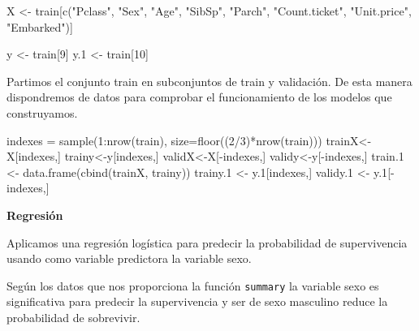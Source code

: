 \documentclass[
]{article}
\newenvironment{Shaded}{\begin{snugshade}}{\end{snugshade}}
\newcommand{\DataTypeTok}[1]{\textcolor[rgb]{0.87,0.87,0.75}{#1}}
\newcommand{\DecValTok}[1]{\textcolor[rgb]{0.86,0.86,0.80}{#1}}
\newcommand{\FloatTok}[1]{\textcolor[rgb]{0.75,0.75,0.82}{#1}}
\newcommand{\KeywordTok}[1]{\textcolor[rgb]{0.94,0.87,0.69}{#1}}
\newcommand{\NormalTok}[1]{\textcolor[rgb]{0.80,0.80,0.80}{#1}}
\newcommand{\OperatorTok}[1]{\textcolor[rgb]{0.94,0.94,0.82}{#1}}
\newcommand{\StringTok}[1]{\textcolor[rgb]{0.80,0.58,0.58}{#1}}
\begin{document}
\begin{Shaded}
\begin{Highlighting}[]
\NormalTok{X <-}\StringTok{ }\NormalTok{train[}\KeywordTok{c}\NormalTok{(}\StringTok{"Pclass"}\NormalTok{, }\StringTok{"Sex"}\NormalTok{, }\StringTok{"Age"}\NormalTok{, }\StringTok{"SibSp"}\NormalTok{, }\StringTok{"Parch"}\NormalTok{, }\StringTok{"Count.ticket"}\NormalTok{, }\StringTok{"Unit.price"}\NormalTok{, }\StringTok{"Embarked"}\NormalTok{)]}

\NormalTok{y <-}\StringTok{ }\NormalTok{train[}\DecValTok{9}\NormalTok{]}
\NormalTok{y}\FloatTok{.1}\NormalTok{ <-}\StringTok{ }\NormalTok{train[}\DecValTok{10}\NormalTok{]}
\end{Highlighting}
\end{Shaded}

Partimos el conjunto train en subconjuntos de train y validación. De
esta manera dispondremos de datos para comprobar el funcionamiento de
los modelos que construyamos.

\begin{Shaded}
\begin{Highlighting}[]
\NormalTok{indexes =}\StringTok{ }\KeywordTok{sample}\NormalTok{(}\DecValTok{1}\OperatorTok{:}\KeywordTok{nrow}\NormalTok{(train), }\DataTypeTok{size=}\KeywordTok{floor}\NormalTok{((}\DecValTok{2}\OperatorTok{/}\DecValTok{3}\NormalTok{)}\OperatorTok{*}\KeywordTok{nrow}\NormalTok{(train)))}
\NormalTok{trainX<-X[indexes,]}
\NormalTok{trainy<-y[indexes,]}
\NormalTok{validX<-X[}\OperatorTok{-}\NormalTok{indexes,]}
\NormalTok{validy<-y[}\OperatorTok{-}\NormalTok{indexes,]}
\NormalTok{train}\FloatTok{.1}\NormalTok{ <-}\StringTok{ }\KeywordTok{data.frame}\NormalTok{(}\KeywordTok{cbind}\NormalTok{(trainX, trainy))}
\NormalTok{trainy}\FloatTok{.1}\NormalTok{ <-}\StringTok{ }\NormalTok{y}\FloatTok{.1}\NormalTok{[indexes,]}
\NormalTok{validy}\FloatTok{.1}\NormalTok{ <-}\StringTok{ }\NormalTok{y}\FloatTok{.1}\NormalTok{[}\OperatorTok{-}\NormalTok{indexes,]}
\end{Highlighting}
\end{Shaded}

\textbf{Regresión}

Aplicamos una regresión logística para predecir la probabilidad de
supervivencia usando como variable predictora la variable sexo.

Según los datos que nos proporciona la función \texttt{summary} la
variable sexo es significativa para predecir la supervivencia y ser de
sexo masculino reduce la probabilidad de sobrevivir.
\end{document}
